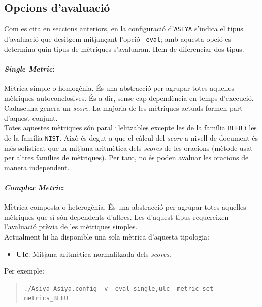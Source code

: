 \documentclass[11pt,a4paper]{article}
\begin{document}
\subsection{Opcions d'avaluació}

Com es cita en seccions anteriors, en la configuració d'\texttt{ASIYA} s'indica el tipus d'avaluació que desitgem mitjançant l'opció \texttt{-eval}; amb aquesta opció es determina quin tipus de mètriques s'avaluaran. Hem de diferenciar dos tipus.

\paragraph{\textit{Single Metric}:} Mètrica simple o homogènia. És una abstracció per agrupar totes aquelles mètriques autoconclosives. És a dir, sense cap dependència en temps d'execució. Cadascuna genera un \textit{score}. La majoria de les mètriques actuals formen part d'aquest conjunt.
\\

Totes aquestes mètriques són paral·lelitzables excepte les de la família \texttt{BLEU} i les de la família \texttt{NIST}. Això és degut a que el càlcul del \textit{score} a nivell de document és més sofisticat que la mitjana aritmètica dels \textit{scores} de les oracions (mètode usat per altres famílies de mètriques). Per tant, no és poden avaluar les oracions de manera independent.

\paragraph{\textit{Complex Metric}:} Mètrica composta o heterogènia. És una abstracció per agrupar totes aquelles mètriques que sí són dependents d'altres. Les d'aquest tipus requereixen l'avaluació prèvia de les mètriques simples.
\\

Actualment hi ha disponible una sola mètrica d'aquesta tipologia:

\begin{itemize}
\item \textbf{Ulc}: Mitjana aritmètica normalitzada dels \textit{scores}.
\end{itemize}

Per exemple:

\begin{quote}
\texttt{./Asiya Asiya.config -v -eval single,ulc -metric\_set metrics\_BLEU}
\end{quote}
\end{document}
